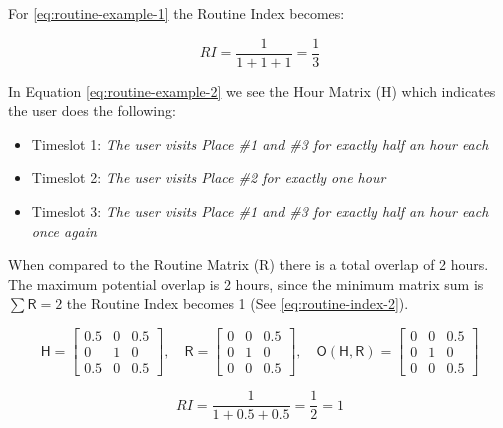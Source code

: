 For \eqref{eq:routine-example-1} the Routine Index becomes:

\begin{equation}
    RI = \frac{1}{1 + 1 + 1} = \frac{1}{3}
\end{equation}

In Equation \eqref{eq:routine-example-2} we see the Hour Matrix (H) which indicates the user does the following:

\begin{itemize}
    \item Timeslot 1: \textit{The user visits Place \#1 and \#3 for exactly half an hour each}
    \item Timeslot 2: \textit{The user visits Place \#2 for exactly one hour}
    \item Timeslot 3: \textit{The user visits Place \#1 and \#3 for exactly half an hour each once again}
\end{itemize}

When compared to the Routine Matrix (R) there is a total overlap of 2 hours. The maximum potential overlap is 2 hours, since the minimum matrix sum is $\sum \mathsf{R} = 2$ the Routine Index becomes 1 (See \ref{eq:routine-index-2}).

\begin{equation}
\label{eq:routine-example-2}
    \mathsf{H} = 
    \begin{bmatrix}
    0.5 & 0 & 0.5\\
    0   & 1 & 0 \\
    0.5 & 0 & 0.5
    \end{bmatrix},\quad
    \mathsf{R} = 
    \begin{bmatrix}
    0 & 0 & 0.5\\
    0 & 1 & 0\\
    0 & 0 & 0.5
    \end{bmatrix},\quad
    \mathsf{O}(\mathsf{H}, \mathsf{R}) = 
    \begin{bmatrix}
    0 & 0 & 0.5\\
    0 & 1 & 0\\
    0 & 0 & 0.5
    \end{bmatrix}
\end{equation}

\begin{equation}
    \label{eq:routine-index-2}
    RI = \frac{1}{1 + 0.5 + 0.5} = \frac{1}{2} = 1
\end{equation}

